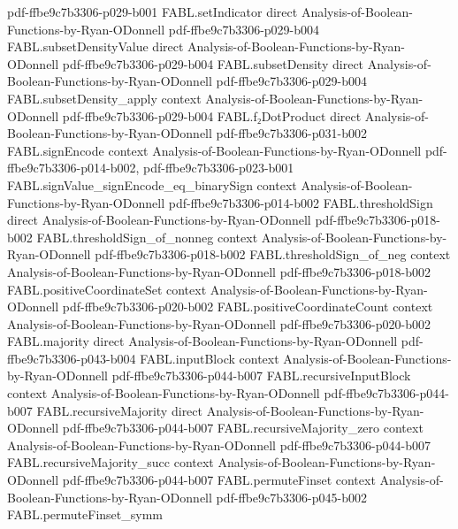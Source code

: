 \begin{theorem}
  {pdf-ffbe9c7b3306-p029-b001}
\proofstep
  {FABL.setIndicator}
  {direct}
  {Analysis-of-Boolean-Functions-by-Ryan-ODonnell}
  {pdf-ffbe9c7b3306-p029-b004}
\proofstep
  {FABL.subsetDensityValue}
  {direct}
  {Analysis-of-Boolean-Functions-by-Ryan-ODonnell}
  {pdf-ffbe9c7b3306-p029-b004}
\proofstep
  {FABL.subsetDensity}
  {direct}
  {Analysis-of-Boolean-Functions-by-Ryan-ODonnell}
  {pdf-ffbe9c7b3306-p029-b004}
\proofstep
  {FABL.subsetDensity_apply}
  {context}
  {Analysis-of-Boolean-Functions-by-Ryan-ODonnell}
  {pdf-ffbe9c7b3306-p029-b004}
\proofstep
  {FABL.f₂DotProduct}
  {direct}
  {Analysis-of-Boolean-Functions-by-Ryan-ODonnell}
  {pdf-ffbe9c7b3306-p031-b002}
\proofstep
  {FABL.signEncode}
  {context}
  {Analysis-of-Boolean-Functions-by-Ryan-ODonnell}
  {pdf-ffbe9c7b3306-p014-b002,
    pdf-ffbe9c7b3306-p023-b001}
\proofstep
  {FABL.signValue_signEncode_eq_binarySign}
  {context}
  {Analysis-of-Boolean-Functions-by-Ryan-ODonnell}
  {pdf-ffbe9c7b3306-p014-b002}
\proofstep
  {FABL.thresholdSign}
  {direct}
  {Analysis-of-Boolean-Functions-by-Ryan-ODonnell}
  {pdf-ffbe9c7b3306-p018-b002}
\proofstep
  {FABL.thresholdSign_of_nonneg}
  {context}
  {Analysis-of-Boolean-Functions-by-Ryan-ODonnell}
  {pdf-ffbe9c7b3306-p018-b002}
\proofstep
  {FABL.thresholdSign_of_neg}
  {context}
  {Analysis-of-Boolean-Functions-by-Ryan-ODonnell}
  {pdf-ffbe9c7b3306-p018-b002}
\proofstep
  {FABL.positiveCoordinateSet}
  {context}
  {Analysis-of-Boolean-Functions-by-Ryan-ODonnell}
  {pdf-ffbe9c7b3306-p020-b002}
\proofstep
  {FABL.positiveCoordinateCount}
  {context}
  {Analysis-of-Boolean-Functions-by-Ryan-ODonnell}
  {pdf-ffbe9c7b3306-p020-b002}
\proofstep
  {FABL.majority}
  {direct}
  {Analysis-of-Boolean-Functions-by-Ryan-ODonnell}
  {pdf-ffbe9c7b3306-p043-b004}
\proofstep
  {FABL.inputBlock}
  {context}
  {Analysis-of-Boolean-Functions-by-Ryan-ODonnell}
  {pdf-ffbe9c7b3306-p044-b007}
\proofstep
  {FABL.recursiveInputBlock}
  {context}
  {Analysis-of-Boolean-Functions-by-Ryan-ODonnell}
  {pdf-ffbe9c7b3306-p044-b007}
\proofstep
  {FABL.recursiveMajority}
  {direct}
  {Analysis-of-Boolean-Functions-by-Ryan-ODonnell}
  {pdf-ffbe9c7b3306-p044-b007}
\proofstep
  {FABL.recursiveMajority_zero}
  {context}
  {Analysis-of-Boolean-Functions-by-Ryan-ODonnell}
  {pdf-ffbe9c7b3306-p044-b007}
\proofstep
  {FABL.recursiveMajority_succ}
  {context}
  {Analysis-of-Boolean-Functions-by-Ryan-ODonnell}
  {pdf-ffbe9c7b3306-p044-b007}
\proofstep
  {FABL.permuteFinset}
  {context}
  {Analysis-of-Boolean-Functions-by-Ryan-ODonnell}
  {pdf-ffbe9c7b3306-p045-b002}
\proofstep
  {FABL.permuteFinset_symm}

\end{theorem}
